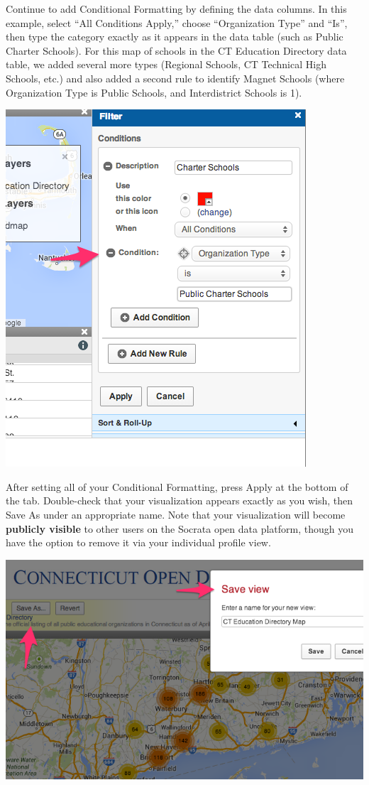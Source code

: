 \documentclass[
  english,
]{book}
\begin{document}
Continue to add Conditional Formatting by defining the data columns. In this example, select ``All Conditions Apply,'' choose ``Organization Type'' and ``Is'', then type the category exactly as it appears in the data table (such as Public Charter Schools). For this map of schools in the CT Education Directory data table, we added several more types (Regional Schools, CT Technical High Schools, etc.) and also added a second rule to identify Magnet Schools (where Organization Type is Public Schools, and Interdistrict Schools is 1).

\includegraphics{images/06-map/SocrataMap11.png}

After setting all of your Conditional Formatting, press Apply at the bottom of the tab. Double-check that your visualization appears exactly as you wish, then Save As under an appropriate name. Note that your visualization will become \textbf{publicly visible} to other users on the Socrata open data platform, though you have the option to remove it via your individual profile view.

\includegraphics{images/06-map/SocrataMap12.png}
\end{document}
